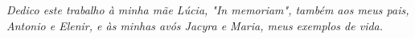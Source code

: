 \thispagestyle{empty}

\vspace*{\fill}
\begin{flushright}
	\begin{minipage}{8cm}
		\textit{
			\qquad Dedico este trabalho à minha mãe Lúcia, "In memoriam", também aos meus pais, Antonio e Elenir, e às minhas avós Jacyra e Maria, meus exemplos de vida.
		}
	\end{minipage}
\end{flushright}
